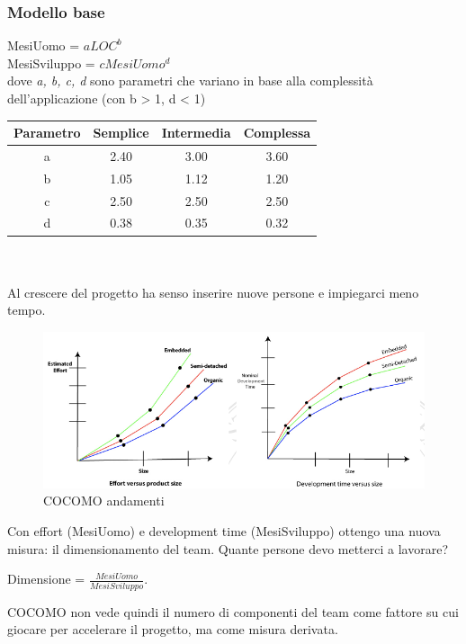 \subsubsection{Modello base}
MesiUomo = \(aLOC^b\) \\
MesiSviluppo = \(cMesiUomo^d\)\\
dove \textit{a, b, c, d} sono parametri che variano in base alla complessità dell'applicazione (con b > 1, d < 1)\\
\begin{tabular}{ |c|c|c|c| } 
    \hline
    \textbf{Parametro} & \textbf{Semplice} & \textbf{Intermedia} & \textbf{Complessa} \\
    \hline
    a & 2.40 & 3.00 & 3.60 \\ 
    b & 1.05 & 1.12 & 1.20 \\ 
    c & 2.50 & 2.50 & 2.50 \\ 
    d & 0.38 & 0.35 & 0.32 \\ 
    \hline
\end{tabular}
\\\\Al crescere del progetto ha senso inserire nuove persone e impiegarci meno tempo.  
\begin{figure}[H]
	\centering
	 \includegraphics[width=\linewidth]{img/cocomoandamenti.png}
	 \caption{COCOMO andamenti}
\end{figure}
\noindent Con effort (MesiUomo) e development time (MesiSviluppo)  ottengo una nuova misura: il dimensionamento del team. Quante persone devo metterci a lavorare?\\
\begin{center}
 Dimensione = \(\frac{MesiUomo}{MesiSviluppo}\).\\   
\end{center}

\noindent COCOMO non vede quindi il numero di componenti del team come fattore su cui giocare per accelerare il progetto, ma come misura derivata.

